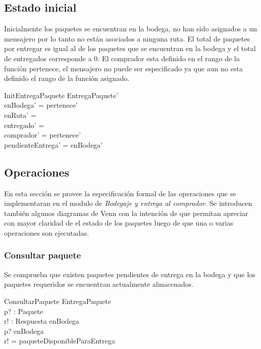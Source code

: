 \documentclass[12pt,a4paper,zed]{article}
\begin{document}
\subsection{Estado inicial}

Inicialmente los paquetes se encuentran en la bodega, no han sido asignados a un mensajero por lo tanto no están asociados a ninguna ruta. El total de paquetes por entregar es igual al de los paquetes que se encuentran en la bodega y el total de entregados corresponde a 0. El comprador esta definido en el rango de la función pertenece, el mensajero no puede ser especificado ya que aun no esta definido el rango de la función asignado.

\begin{schema}{InitEntregaPaquete}
EntregaPaquete'\\
\where
enBodega' = \dom pertenece'\\
enRuta' = \emptyset\\
entregado' = \emptyset\\
comprador' = \ran pertenece'\\
pendienteEntrega' = enBodega'
\end{schema}

\subsection{Operaciones}

En esta sección se provee la especificación formal de las operaciones que se implementaran en el modulo de \textit{Bodegaje y entrega al comprador}. Se introducen también algunos diagramas de Venn con la intención de que permitan apreciar con mayor claridad de el estado de los paquetes luego de que una o varias operaciones son ejecutadas.

\subsubsection{Consultar paquete}

Se comprueba que existen paquetes pendientes de entrega en la bodega y que los paquetes requeridos se encuentran actualmente almacenados.

\begin{schema}{ConsultarPaquete}
\Xi EntregaPaquete\\
p? : Paquete\\
r! : Respuesta
\where
enBodega \neq \emptyset\\
p? \in enBodega\\
r! = paqueteDisponibleParaEntrega
\end{schema}
\end{document}
